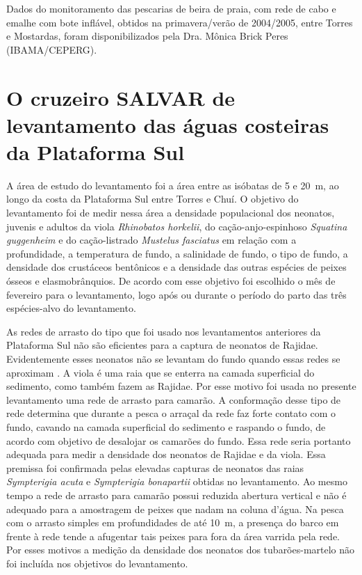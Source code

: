 \documentclass[a4paper,11pt,twoside,showtrims,onecolumn,openright,final]{memoir}
\begin{document}
Dados do monitoramento das pescarias de beira de praia, com rede de cabo e emalhe com bote inflável,
obtidos na primavera/verão de 2004/2005, entre Torres e Mostardas,
foram disponibilizados pela Dra. Mônica Brick Peres (IBAMA/CEPERG).

\section*{O cruzeiro SALVAR de levantamento das águas costeiras da Plataforma Sul}

A área de estudo do levantamento foi a área entre as isóbatas de 5 e 20~m, ao longo da costa 
da Plataforma Sul entre Torres e Chuí. O objetivo do levantamento foi de medir nessa área 
a densidade populacional  dos neonatos, juvenis e adultos da viola \emph{Rhinobatos horkelii}, 
do cação-anjo-espinhoso \emph{Squatina guggenheim} e 
do cação-listrado \emph{Mustelus fasciatus}  em relação com a profundidade, a temperatura de fundo, 
a salinidade de fundo, o tipo de fundo, a densidade dos crustáceos bentônicos e 
a densidade das outras espécies de peixes ósseos e elasmobrânquios. 
De acordo com esse objetivo foi escolhido o mês de fevereiro para o levantamento, 
logo após ou durante o período do parto das três espécies-alvo do levantamento. 

As redes de arrasto do tipo que foi usado nos levantamentos anteriores da Plataforma Sul não 
são eficientes para a captura de neonatos de Rajidae. Evidentemente esses neonatos não se levantam 
do fundo quando essas redes se aproximam \citep{oddone2004}. %
A viola é uma raia que se enterra na camada superficial do sedimento, como 
também fazem as Rajidae. %
Por esse motivo foi usada no presente levantamento uma rede de arrasto para camarão. 
A conformação desse tipo de rede determina que durante a pesca o arraçal da rede faz forte 
contato com o fundo, cavando na camada superficial do sedimento e raspando o fundo, de acordo 
com  objetivo de desalojar os camarões do fundo. Essa rede seria  portanto adequada para medir 
a densidade dos neonatos de Rajidae e da viola. Essa premissa foi confirmada pelas elevadas capturas 
de neonatos das raias \emph{Sympterigia acuta} e \emph{Sympterigia bonapartii} obtidas no levantamento. 
Ao mesmo tempo a rede de arrasto para camarão possui reduzida abertura vertical e não é adequado para 
a amostragem de peixes que nadam na coluna d'água. Na pesca com o arrasto simples em profundidades 
de até 10~m, a presença do barco em frente à rede tende a afugentar tais peixes para fora da área 
varrida pela rede. Por esses motivos a medição da densidade dos neonatos dos tubarões-martelo 
não foi incluída nos objetivos do levantamento. 
\end{document}
